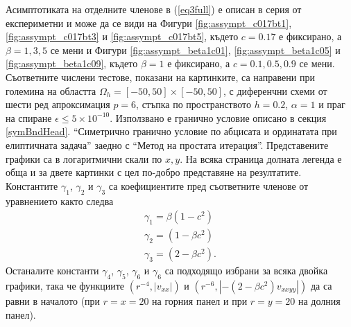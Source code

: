\documentclass[a4paper]{article}
\newcommand{\rf}[1]{(\ref{#1})}
\theoremstyle{remark}
\begin{document}
Асимптотиката на отделните членове в \rf{eq3full} е описан в серия от експериметни и може да се види на Фигури \ref{fig:assympt_c017bt1}, \ref{fig:assympt_c017bt3} и \ref{fig:assympt_c017bt5}, където $c=0.17$ е фиксирано, а $\beta = 1, 3, 5$ се мени и Фигури \ref{fig:assympt_beta1c01}, \ref{fig:assympt_beta1c05} и \ref{fig:assympt_beta1c09}, където $\beta=1$ е фиксирано, а $c = 0.1, 0.5, 0.9$ се мени. Съответните числени тестове, показани на картинките, са направени при големина на областта $\Omega_h = [-50, 50] \times [-50, 50]$, с диференчни схеми от шести ред апроксимация $p=6$, стъпка по пространството $h=0.2$, $\alpha = 1$ и праг на спиране $\epsilon \le 5 \times 10^{-10}$. Използвано е гранично условие описано в секция \ref{symBndHead}. ``Симетрично гранично условие по абцисата и ординатата при елиптичната задача'' заедно с ``Метод на простата итерация''. Представените графики са в логаритмични скали по $x,y$. На всяка страница долната легенда е обща и за двете картинки с цел по-добро представяне на резултатите. Константите $\gamma_1$, $\gamma_2$ и $\gamma_3$ са коефициентите пред съответните членове от уравнението както следва
\begin{align*}
\gamma_1 = \beta (1-c^2) \\
\gamma_2 = (1-\beta c^2) \\
\gamma_3 = (2-\beta c^2).
\end{align*}
Останалите константи $\gamma_4$, $\gamma_5$, $\gamma_6$ и $\gamma_6$ са подходящо избрани за всяка двойка графики, така че функциите $(r^{-4}, |v_{xx}|)$ и $(r^{-6}, |- (2-\beta c^2)v_{xxyy}|)$ да са равни в началото (при $r=x=20$ на горния панел и при $r=y=20$ на долния панел).
\end{document}
